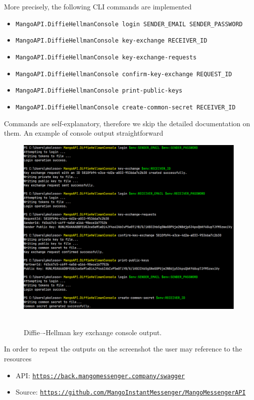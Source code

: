 \documentclass[12pt,letterpaper,oneside,reqno]{amsart}
\numberwithin{equation}{section}
\begin{document}
    More precisely, the following CLI commands are implemented
    \begin{itemize}
        \item \texttt{MangoAPI.DiffieHellmanConsole login SENDER\_EMAIL SENDER\_PASSWORD}
        \item \texttt{MangoAPI.DiffieHellmanConsole key-exchange RECEIVER\_ID}
        \item \texttt{MangoAPI.DiffieHellmanConsole key-exchange-requests}
        \item \texttt{MangoAPI.DiffieHellmanConsole confirm-key-exchange REQUEST\_ID}
        \item \texttt{MangoAPI.DiffieHellmanConsole print-public-keys}
        \item \texttt{MangoAPI.DiffieHellmanConsole create-common-secret RECEIVER\_ID}
    \end{itemize}
    Commands are self-explanatory, therefore we skip the detailed documentation on them.
    An example of console output straightforward
    \begin{figure}[H]
        \centering
        \includegraphics[width=1\textwidth]{Pictures/Diffie_Hellman_console_output}
        ~\caption{Diffie–-Hellman key exchange console output.}\label{fig:figure7}
    \end{figure}
    In order to repeat the outputs on the screenshot the user may reference to the resources
    \begin{itemize}
        \item API: \href{https://back.mangomessenger.company/swagger}{\texttt{https://back.mangomessenger.company/swagger}}
        \item Source: \href{https://github.com/MangoInstantMessenger/MangoMessengerAPI}{\texttt{https://github.com/MangoInstantMessenger/MangoMessengerAPI}}
    \end{itemize}
\end{document}
